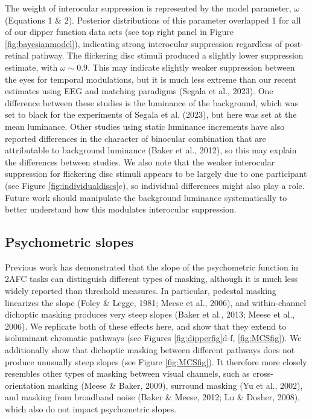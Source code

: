 \documentclass[
]{article}
\begin{document}
The weight of interocular suppression is represented by the model parameter, \(\omega\) (Equations 1 \& 2). Posterior distributions of this parameter overlapped 1 for all of our dipper function data sets (see top right panel in Figure \ref{fig:bayesianmodel}), indicating strong interocular suppression regardless of post-retinal pathway. The flickering disc stimuli produced a slightly lower suppression estimate, with \(\omega \sim 0.9\). This may indicate slightly weaker suppression between the eyes for temporal modulations, but it is much less extreme than our recent estimates using EEG and matching paradigms (Segala et al., 2023). One difference between these studies is the luminance of the background, which was set to black for the experiments of Segala et al. (2023), but here was set at the mean luminance. Other studies using static luminance increments have also reported differences in the character of binocular combination that are attributable to background luminance (Baker et al., 2012), so this may explain the differences between studies. We also note that the weaker interocular suppression for flickering disc stimuli appears to be largely due to one participant (see Figure \ref{fig:individualdiscs}c), so individual differences might also play a role. Future work should manipulate the background luminance systematically to better understand how this modulates interocular suppression.

\hypertarget{psychometric-slopes}{%
\subsection{Psychometric slopes}\label{psychometric-slopes}}

Previous work has demonstrated that the slope of the psychometric function in 2AFC tasks can distinguish different types of masking, although it is much less widely reported than threshold measures. In particular, pedestal masking linearizes the slope (Foley \& Legge, 1981; Meese et al., 2006), and within-channel dichoptic masking produces very steep slopes (Baker et al., 2013; Meese et al., 2006). We replicate both of these effects here, and show that they extend to isoluminant chromatic pathways (see Figures \ref{fig:dipperfig}d-f, \ref{fig:MCSfig}). We additionally show that dichoptic masking between different pathways does not produce unusually steep slopes (see Figure \ref{fig:MCSfig}). It therefore more closely resembles other types of masking between visual channels, such as cross-orientation masking (Meese \& Baker, 2009), surround masking (Yu et al., 2002), and masking from broadband noise (Baker \& Meese, 2012; Lu \& Dosher, 2008), which also do not impact psychometric slopes.
\end{document}
